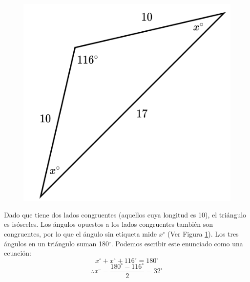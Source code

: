 \begin{minipage}[t][][t]{0.6\textwidth}
    \begin{solutionbox}{8cm}
        \begin{minipage}{0.3\textwidth}
            \begin{figure}[H]
                \centering
                \includegraphics[width=0.9\linewidth]{../images/findangle14a.png}
                \caption{}
                \label{fig:findangle14a}
            \end{figure}
        \end{minipage}\hfill
        \begin{minipage}{0.65\textwidth}
            Dado que tiene dos lados congruentes (aquellos cuya longitud es 10), el triángulo es isósceles. Los ángulos opuestos a los lados congruentes también son congruentes, por lo que el ángulo sin etiqueta mide $x^\circ$ (Ver Figura \ref{fig:findangle14a}).
            Los tres ángulos en un triángulo suman 180$^\circ$. Podemos escribir este enunciado como una ecuación:
            \[x^\circ + x^\circ + 116^\circ = 180^\circ \]
            \[\therefore x^\circ = \dfrac{180^\circ - 116^\circ}{2}  = 32^\circ\]
        \end{minipage}
    \end{solutionbox}
\end{minipage}